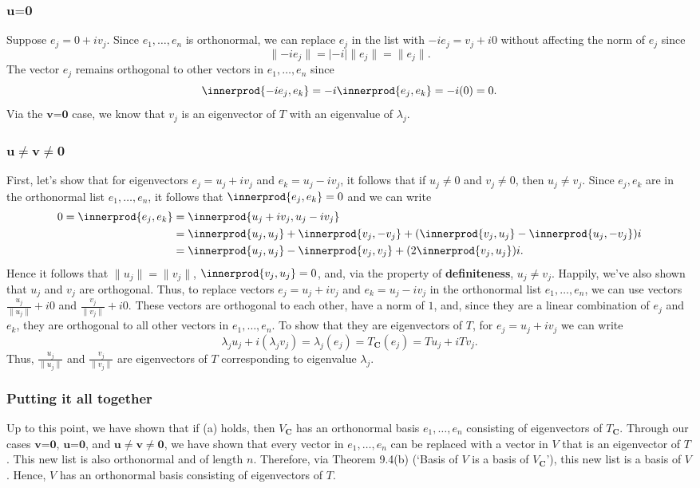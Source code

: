 \documentclass{article}
\providecommand{\abs}[1]{\lvert#1\rvert} \providecommand{\norm}[1]{\lVert#1\rVert}
\DeclarePairedDelimiter{\innerprod}\langle\rangle
\begin{document}
\subsubsection*{$\textbf{u=0}$}
Suppose $e_j=0+iv_j$. Since $e_1,\ldots,e_n$ is orthonormal, we can replace $e_j$ in the list with $-ie_j=v_j+i0$ without affecting the norm of $e_j$ since 
\[\norm{-ie_j}=\abs{-i}\norm{e_j}=\norm{e_j}.\]
The vector $e_j$ remains orthogonal to other vectors in $e_1,\ldots,e_n$ since
\[\innerprod{-ie_j,e_k}=-i\innerprod{e_j,e_k}=-i(0)=0.\]
Via the $\textbf{v=0}$ case, we know that $v_j$ is an eigenvector of $T$ with an eigenvalue of $\lambda_j$.

\subsubsection*{$\textbf{u}\neq\textbf{v}\neq\textbf{0}$}
First, let's show that for eigenvectors $e_j=u_j+iv_j$ and\newline 
$e_k=u_j-iv_j$, it follows that if $u_j\neq 0$ and $v_j\neq0$, then $u_j\neq v_j$. 
Since $e_j,e_k$ are in the orthonormal list $e_1,\ldots,e_n$, it follows that $\innerprod{e_j,e_k}=0$ and we can write
\begin{align*}
    0=\innerprod{e_j,e_k}&=\innerprod{u_j+iv_j,u_j-iv_j}\\
    &=\innerprod{u_j,u_j} +\innerprod{v_j,-v_j} + (\innerprod{v_j,u_j} - \innerprod{u_j,-v_j})i\\
    &=\innerprod{u_j,u_j} -\innerprod{v_j,v_j} + (2\innerprod{v_j,u_j})i.
\end{align*}
Hence it follows that $\norm{u_j}=\norm{v_j}$, $\innerprod{v_j,u_j}=0$, and, via the property of \textbf{definiteness}, $u_j\neq v_j$. 
Happily, we've also shown that $u_j$ and $v_j$ are orthogonal. 
Thus, to replace vectors $e_j=u_j+iv_j$ and $e_k=u_j-iv_j$ in the orthonormal list $e_1,\ldots,e_n$, we can use vectors $\frac{u_j}{\norm{u_j}}+i0$ and $\frac{v_j}{\norm{v_j}}+i0$. 
These vectors are orthogonal to each other, have a norm of $1$, and, since they are a linear combination of $e_j$ and $e_k$, they are orthogonal to all other vectors in $e_1,\ldots,e_n$. 
To show that they are eigenvectors of $T$, for $e_j=u_j+iv_j$ we can write
\[\lambda_ju_j+i(\lambda_jv_j)=\lambda_j(e_j)=T_{\mathbf{C}}(e_j)=Tu_j+iTv_j.\]
Thus, $\frac{u_j}{\norm{u_j}}$ and $\frac{v_j}{\norm{v_j}}$ are eigenvectors of $T$ corresponding to eigenvalue $\lambda_j$.

\subsubsection*{Putting it all together}
Up to this point, we have shown that if (a) holds, then $V_{\textbf{C}}$ has an orthonormal basis $e_1,\ldots,e_n$ consisting of eigenvectors of $T_{\textbf{C}}$. 
Through our cases $\textbf{v=0}$, $\textbf{u=0}$, and $\textbf{u}\neq\textbf{v}\neq\textbf{0}$, we have shown that every vector in $e_1,\ldots,e_n$ can be replaced with a vector in $V$ that is an eigenvector of $T$. 
This new list is also orthonormal and of length $n$. 
Therefore, via Theorem 9.4(b) (`Basis of $V$ is a basis of $V_{\textbf{C}}$'), this new list is a basis of $V$. Hence, $V$ has an orthonormal basis consisting of eigenvectors of $T$. 
\end{document}
